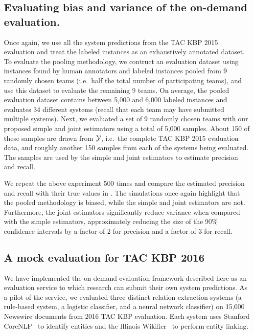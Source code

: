 \subsection{Evaluating bias and variance of the on-demand evaluation.}
Once again, we use all the system predictions from the TAC KBP 2015 evaluation and treat the labeled instances as an exhaustively annotated dataset.
To evaluate the pooling methodology, we contruct an evaluation dataset using
instances found by human annotators and labeled instances pooled from 9
randomly chosen teams (i.e.\ half the total number of participating teams), and
use this dataset to evaluate the remaining 9 teams.
On average, the pooled evaluation dataset contains between 5,000 and 6,000 labeled instances and evaluates 34 different systems (recall that each team may have submitted multiple systems).
Next, we evaluated a set of 9 randomly chosen teams with our proposed simple and joint estimators using a total of 5,000 samples.
About 150 of these samples are drawn from $\mathcal{Y}$, i.e.\ the complete TAC KBP 2015 evaluation data, and roughly another 150 samples from each of the systems being evaluated.
The samples are used by the simple and joint estimators to estimate precision and recall.

We repeat the above experiment 500 times and compare the estimated precision and recall with their true values in .
The simulations once again highlight that the pooled methodology is biased, while the simple and joint estimators are not.
Furthermore, the joint estimators significantly reduce variance when compared with the simple estimators,
approximately reducing the size of the 90\% confidence intervals by a factor of 2 for precision and a factor of 3 for recall.

\subsection{A mock evaluation for TAC KBP 2016}
We have implemented the on-demand evaluation framework described here as an evaluation service to which research can submit their own system predictions.
As a pilot of the service, we evaluated three distinct relation extraction systems (a rule-based system, a logistic classifier, and a neural network classifier) on 15,000 Newswire documents from 2016 TAC KBP evaluation.
Each system uses Stanford CoreNLP~\citep{manning2014stanford} to identify entities and the Illinois Wikifier~\citep{ratinov2011local} to perform entity linking. 

